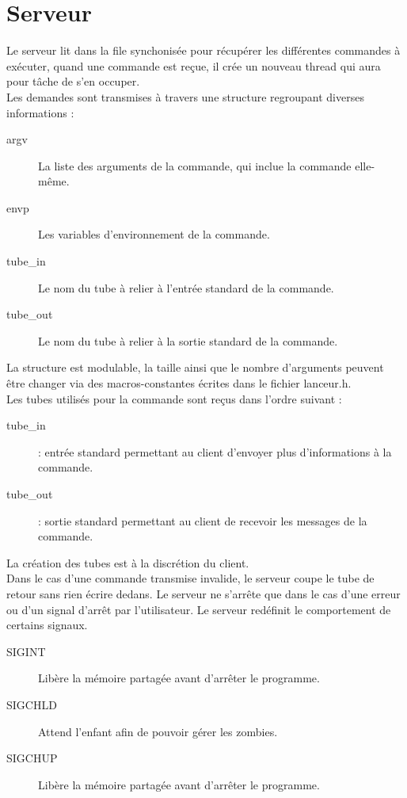 \documentclass[12pt]{article}
\begin{document}
\newpage
\section{Serveur}
    Le serveur lit dans la file synchonisée pour récupérer les différentes commandes à exécuter, quand une commande est reçue, il crée un nouveau thread qui aura pour tâche de s'en occuper.\\
    Les demandes sont transmises à travers une structure regroupant diverses informations :
    \begin{description}
        \item [argv] La liste des arguments de la commande, qui inclue la commande elle-même.
        \item [envp] Les variables d'environnement de la commande.
        \item [tube\_in] Le nom du tube à relier à l'entrée standard de la commande.
        \item [tube\_out] Le nom du tube à relier à la sortie standard de la commande.
    \end{description}
    La structure est modulable, la taille ainsi que le nombre d'arguments peuvent être changer via des macros-constantes écrites dans le fichier lanceur.h.\\
    Les tubes utilisés pour la commande sont reçus dans l'ordre suivant :
    \begin{description}
        \item [tube\_in]  : entrée standard permettant au client d'envoyer plus d'informations à la commande.
        \item [tube\_out] : sortie standard permettant au client de recevoir les messages de la commande.
    \end{description}
    La création des tubes est à la discrétion du client.\\
    Dans le cas d'une commande transmise invalide, le serveur coupe le tube de retour sans rien écrire dedans.
    Le serveur ne s'arrête que dans le cas d'une erreur ou d'un signal d'arrêt par l'utilisateur.
    Le serveur redéfinit le comportement de certains signaux.
    \begin{description}
      \item [SIGINT] Libère la mémoire partagée avant d'arrêter le programme.
      \item [SIGCHLD] Attend l'enfant afin de pouvoir gérer les zombies.
      \item [SIGCHUP] Libère la mémoire partagée avant d'arrêter le programme.
    \end{description}
\newpage
\end{document}
